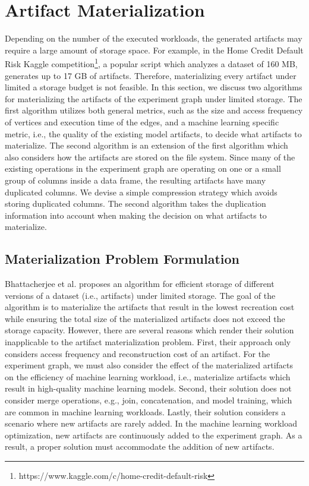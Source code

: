 \section{Artifact Materialization}\label{sec-materialization}
Depending on the number of the executed workloads, the generated artifacts may require a large amount of storage space.
For example, in the Home Credit Default Risk Kaggle competition\footnote{https://www.kaggle.com/c/home-credit-default-risk}, a popular script which analyzes a dataset of 160 MB, generates up to 17 GB of artifacts.
Therefore, materializing every artifact under limited a storage budget is not feasible.
In this section, we discuss two algorithms for materializing the artifacts of the experiment graph under limited storage.
The first algorithm utilizes both general metrics, such as the size and access frequency of vertices and execution time of the edges, and a machine learning specific metric, i.e., the quality of the existing model artifacts, to decide what artifacts to materialize.
The second algorithm is an extension of the first algorithm which also considers how the artifacts are stored on the file system.
Since many of the existing operations in the experiment graph are operating on one or a small group of columns inside a data frame, the resulting artifacts have many duplicated columns.
We devise a simple compression strategy which avoids storing duplicated columns.
The second algorithm takes the duplication information into account when making the decision on what artifacts to materialize.

\subsection{Materialization Problem Formulation}\label{subsec-materialization-problem}
Bhattacherjee et al. \cite{bhattacherjee2015principles} proposes an algorithm for efficient storage of different versions of a dataset (i.e., artifacts) under limited storage.
The goal of the algorithm is to materialize the artifacts that result in the lowest recreation cost while ensuring the total size of the materialized artifacts does not exceed the storage capacity.
However, there are several reasons which render their solution inapplicable to the artifact materialization problem.
First, their approach only considers access frequency and reconstruction cost of an artifact.
For the experiment graph, we must also consider the effect of the materialized artifacts on the efficiency of machine learning workload, i.e., materialize artifacts which result in high-quality machine learning models.
Second, their solution does not consider merge operations, e.g., join, concatenation, and model training, which are common in machine learning workloads.
Lastly, their solution considers a scenario where new artifacts are rarely added.
In the machine learning workload optimization, new artifacts are continuously added to the experiment graph.
As a result, a proper solution must accommodate the addition of new artifacts.

